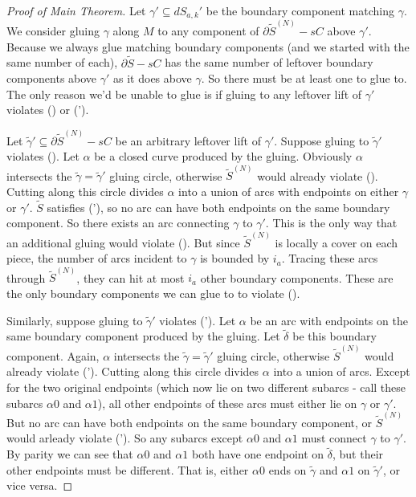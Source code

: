 \documentclass[12pt]{amsart}
\theoremstyle{definition}
\theoremstyle{remark}
\newcommand{\bd}{\partial}
\newcommand{\cin}{\subseteq}
\begin{document}
\begin{proof}[Proof of Main Theorem]
Let $\gamma' \cin dS_{a,k}'$ be the boundary component matching $\gamma$. We
consider gluing $\gamma$ along $M$ to any component of $\bd\widetilde{S}^{(N)}
- sC$ above $\gamma'$.  Because we always glue matching boundary components
(and we started with the same number of each), $\bd\widetilde{S} - sC$ has the
same number of leftover boundary components above $\gamma'$ as it does above
$\gamma$. So there must be at least one to glue to.  The only reason we'd be
unable to glue is if gluing to any leftover lift of $\gamma'$ violates (\dag) or
(\dag').

Let $\widetilde{\gamma}' \cin \bd\widetilde{S}^{(N)} - sC$ be an arbitrary
leftover lift of $\gamma'$.  Suppose gluing to $\widetilde{\gamma}'$ violates
(\dag). Let $\alpha$ be a closed curve produced by the gluing.  Obviously
$\alpha$ intersects the $\widetilde{\gamma} = \widetilde{\gamma}'$ gluing
circle, otherwise $\widetilde{S}^{(N)}$ would already violate (\dag).  Cutting
along this circle divides $\alpha$ into a union of arcs with endpoints on
either $\gamma$ or $\gamma'$.  $\widetilde{S}$ satisfies (\dag'), so no arc can
have both endpoints on the same boundary component. So there exists an arc
connecting $\gamma$ to $\gamma'$. This is the only way that an additional
gluing would violate (\dag). But since $\widetilde{S}^{(N)}$ is locally a cover
on each piece, the number of arcs incident to $\gamma$ is bounded by $i_a$.
Tracing these arcs through $\widetilde{S}^{(N)}$, they can hit at most $i_a$
other boundary components.  These are the only boundary components we can glue
to to violate (\dag).

Similarly, suppose gluing to $\widetilde{\gamma}'$ violates (\dag'). Let $\alpha$ be an
arc with endpoints on the same boundary component produced by the gluing. Let
$\widetilde{\delta}$ be this boundary component. Again, $\alpha$ intersects the
$\widetilde{\gamma} = \widetilde{\gamma}'$ gluing circle, otherwise $\widetilde{S}^{(N)}$ would already
violate (\dag').  Cutting along this circle divides $\alpha$ into a union of
arcs.  Except for the two original endpoints (which now lie on two different
subarcs - call these subarcs $\alpha0$ and $\alpha1$), all other endpoints of
these arcs must either lie on $\gamma$ or $\gamma'$.  But no arc can have both
endpoints on the same boundary component, or $\widetilde{S}^{(N)}$ would arleady violate
(\dag'). So any subarcs except $\alpha0$ and $\alpha1$ must connect $\gamma$ to
$\gamma'$.  By parity we can see that $\alpha0$ and $\alpha1$ both have one
endpoint on $\widetilde{\delta}$, but their other endpoints must be different. That is,
either $\alpha0$ ends on $\widetilde{\gamma}$ and $\alpha1$ on $\widetilde{\gamma}'$, or vice
versa.


\end{proof}
\end{document}
